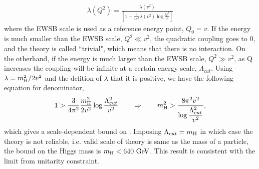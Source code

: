 \begin{eqnarray} 
\displaystyle  \lambda(Q^2) = \frac{\lambda(v^2)} {\left[\displaystyle   1 - \frac{3}{4\pi^2} \lambda(v^2) \log{\frac{Q^2}{v^2}}\right] } 
\end{eqnarray} 
where the EWSB scale is used as a reference energy point, $Q_0 = v$. 
If the energy is much smaller than the EWSB scale, $Q^2\ll v^2$, 
the quadratic coupling goes to 0, and the theory is called 
``trivial", which means that there is no interaction. 
On the otherhand, if the energy is much larger than the EWSB scale, $Q^2\gg v^2$,
as Q increases the coupling will be infinite at a certain energy scale, $\Lambda_{cut}$. 
Using $\lambda = m_{\mathrm{H}}^2/2v^2$ and the defition of $\lambda$ that it is positive, 
we have the following equation for denominator,
\begin{eqnarray} 
1 > \frac{3}{4\pi^2} \frac{m_{\mathrm{H}}^2}{2v^2} \log{\frac{\Lambda_{cut}^2}{v^2}} 
\qquad \Rightarrow  \qquad 
m_{\mathrm{H}}^2 > \frac{8\pi^2v^2}{\log{\displaystyle  \frac{\Lambda_{cut}^2}{v^2}}},
\end{eqnarray} 
which gives a scale-dependent bound on \mHi. Imposing $\Lambda_{cut} = m_{\mathrm{H}}$ 
in which case the theory is not reliable, i.e. valid scale of theory is same 
as the mass of a particle, the bound on the Higgs mass is $m_{\mathrm{H}} < 640~\mathrm{Ge\kern -0.1em V}$. 
This result is consistent with the limit from unitarity constraint. 

